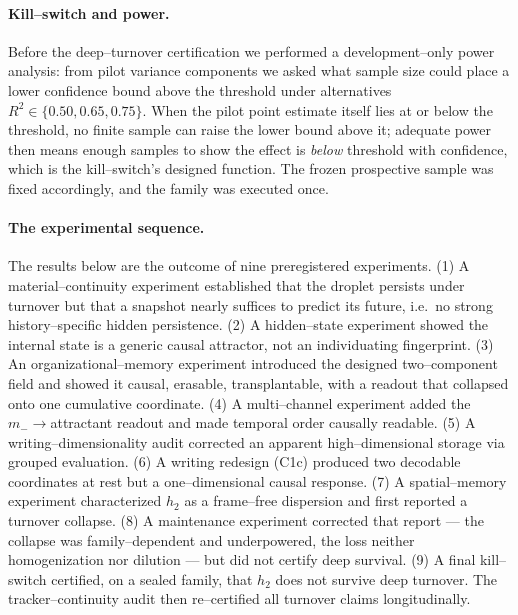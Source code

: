 \documentclass[11pt]{article}
\begin{document}
\paragraph{Kill--switch and power.} Before the deep--turnover certification we performed a development--only power
analysis: from pilot variance components we asked what sample size could place a lower confidence bound above the
threshold under alternatives $R^2\in\{0.50,0.65,0.75\}$. When the pilot point estimate itself lies at or below the
threshold, no finite sample can raise the lower bound above it; adequate power then means enough samples to show the
effect is \emph{below} threshold with confidence, which is the kill--switch's designed function. The frozen
prospective sample was fixed accordingly, and the family was executed once. \paragraph{The experimental sequence.} The results below are the outcome of nine preregistered experiments. (1) A material--continuity experiment established that the droplet persists under turnover but that a snapshot nearly suffices to predict its future, i.e.\ no strong history--specific hidden persistence. (2) A hidden--state experiment showed the internal state is a generic causal attractor, not an individuating fingerprint. (3) An organizational--memory experiment introduced the designed two--component field and showed it causal, erasable, transplantable, with a readout that collapsed onto one cumulative coordinate. (4) A multi--channel experiment added the $m_-\!\to$attractant readout and made temporal order causally readable. (5) A writing--dimensionality audit corrected an apparent high--dimensional storage via grouped evaluation. (6) A writing redesign (C1c) produced two decodable coordinates at rest but a one--dimensional causal response. (7) A spatial--memory experiment characterized $h_2$ as a frame--free dispersion and first reported a turnover collapse. (8) A maintenance experiment corrected that report --- the collapse was family--dependent and underpowered, the loss neither homogenization nor dilution --- but did not certify deep survival. (9) A final kill--switch certified, on a sealed family, that $h_2$ does not survive deep turnover. The tracker--continuity audit then re--certified all turnover claims longitudinally.
\end{document}
